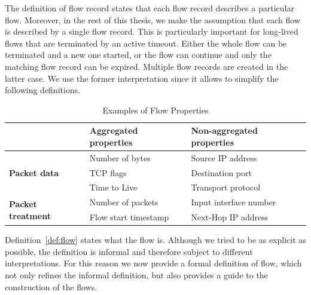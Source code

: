 The definition of flow record states that each flow record describes a particular flow. Moreover, in the rest of this thesis, we make the assumption that each flow is described by a single flow record. This is particularly important for long-lived flows that are terminated by an active timeout. Either the whole flow can be terminated and a new one started, or the flow can continue and only the matching flow record can be expired. Multiple flow records are created in the latter case. We use the former interpretation since it allows to simplify the following definitions.

\begin{table}[ht!]
    \centering
    \begin{tabular}{lll}
    \toprule
                                               & \textbf{Aggregated properties}  & \textbf{Non-aggregated properties}  \\ \midrule
    \multirow{3}{*}{\textbf{Packet data}}      & Number of bytes                 & Source IP address                   \\ 
                                               & TCP flags                       & Destination port                    \\ 
                                               & Time to Live                    & Transport protocol                  \\ \midrule
    \multirow{2}{*}{\textbf{Packet treatment}} & Number of packets               & Input interface number              \\ 
                                               & Flow start timestamp            & Next-Hop IP address                 \\ \bottomrule
    \end{tabular}
    \caption{Examples of Flow Properties}
    \label{tab:flow.properties}
\end{table}

Definition~\ref{def:flow} states what the flow is. Although we tried to be as explicit as possible, the definition is informal and therefore subject to different interpretations. For this reason we now provide a formal definition of flow, which not only refines the informal definition, but also provides a guide to the construction of the flows.

